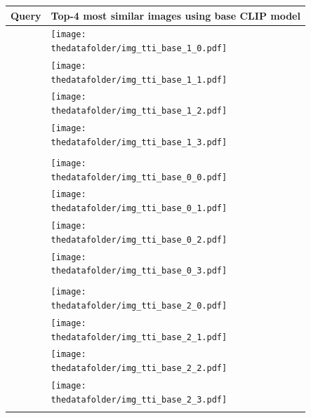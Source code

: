 \documentclass[10pt]{article} %
\begin{document}
\begin{table}[h!]
  \centering
  \begin{tabular}{m{2.7cm} p{2.9cm} p{2.9cm} p{2.9cm} p{2.9cm}}
      \toprule
      \centering \bfseries Query & \multicolumn{4}{c}{\bfseries{Top-4 most similar images using \textcolor{deeppurple}{base CLIP model}}} \tabularnewline
      \midrule
      \texttt{} \vspace{20mm} & \centering \texttt{[image: \\thedatafolder/img\_tti\_base\_1\_0.pdf]} \\  & \centering \texttt{[image: \\thedatafolder/img\_tti\_base\_1\_1.pdf]} \\  & \centering \texttt{[image: \\thedatafolder/img\_tti\_base\_1\_2.pdf]} \\  & \centering \texttt{[image: \\thedatafolder/img\_tti\_base\_1\_3.pdf]} \\   \tabularnewline
      \midrule
       \texttt{} \vspace{20mm} & \centering \texttt{[image: \\thedatafolder/img\_tti\_base\_0\_0.pdf]} \\  & \centering \texttt{[image: \\thedatafolder/img\_tti\_base\_0\_1.pdf]} \\  & \centering \texttt{[image: \\thedatafolder/img\_tti\_base\_0\_2.pdf]} \\  & \centering \texttt{[image: \\thedatafolder/img\_tti\_base\_0\_3.pdf]} \\   \tabularnewline
      \midrule
      \texttt{} \vspace{20mm} & \centering \texttt{[image: \\thedatafolder/img\_tti\_base\_2\_0.pdf]} \\  & \centering \texttt{[image: \\thedatafolder/img\_tti\_base\_2\_1.pdf]} \\  & \centering \texttt{[image: \\thedatafolder/img\_tti\_base\_2\_2.pdf]} \\  & \centering \texttt{[image: \\thedatafolder/img\_tti\_base\_2\_3.pdf]} \\   \tabularnewline

\end{tabular}
\end{table}
\end{document}

